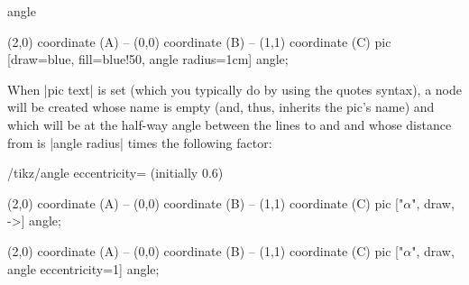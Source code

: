 \begin{pictype}{angle}{}
\begin{codeexample}[]
\tikz \draw [line width=2mm]
      (2,0) coordinate (A) -- (0,0) coordinate (B)
   -- (1,1) coordinate (C)
     pic [draw=blue, fill=blue!50, angle radius=1cm] {angle};
\end{codeexample}

  When |pic text| is set (which you typically do by using the quotes
  syntax), a node will be created whose name is empty 
  (and, thus, inherits the pic's name) and which will be at the
  half-way angle between the lines to  and  and whose
  distance from  is |angle radius| times the following factor:
  \begin{key}{/tikz/angle eccentricity= (initially 0.6)}
\begin{codeexample}[]
\tikz \draw (2,0) coordinate (A) -- (0,0) coordinate (B)
         -- (1,1) coordinate (C)
  pic ["$\alpha$", draw, ->] {angle};
\end{codeexample}        
\begin{codeexample}[]
\tikz \draw (2,0) coordinate (A) -- (0,0) coordinate (B)
         -- (1,1) coordinate (C)
  pic ["$\alpha$", draw, angle eccentricity=1] {angle};
\end{codeexample}        
\begin{codeexample}[]
\end{codeexample}        
  \end{key}  
\end{pictype}


